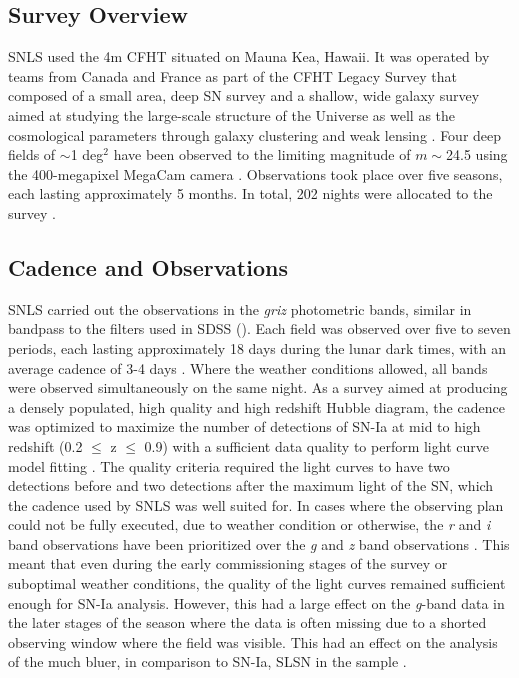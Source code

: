 \subsection{Survey Overview}
SNLS used the 4m CFHT situated on Mauna Kea, Hawaii. It was operated by teams from Canada and France as part of the CFHT Legacy Survey that composed of a small area, deep SN survey and a shallow, wide galaxy survey aimed at studying the large-scale structure of the Universe as well as the cosmological parameters through galaxy clustering and weak lensing \citep{Pritchet2004,Astier2006}. Four deep fields of $\sim$1 deg$^2$ have been observed to the limiting magnitude of $m\sim$24.5 using the 400-megapixel MegaCam camera \citep{Boulade2003}. Observations took place over five seasons, each lasting approximately 5 months. In total, 202 nights were allocated to the survey \citep{Pritchet2004}.

\subsection{Cadence and Observations}
SNLS carried out the observations in the \textit{griz} photometric bands, similar in bandpass to the filters used in SDSS (). Each field was observed over five to seven periods, each lasting approximately 18 days during the lunar dark times, with an average cadence of 3-4 days \citep{Astier2006,Guy2010}. Where the weather conditions allowed, all bands were observed simultaneously on the same night. As a survey aimed at producing a densely populated, high quality and high redshift Hubble diagram, the cadence was optimized to maximize the number of detections of SN-Ia at mid to high redshift (0.2 $\leq$ z $\leq$ 0.9) with a sufficient data quality to perform light curve model fitting \citep{Pritchet2004}. The quality criteria required the light curves to have two detections before and two detections after the maximum light of the SN, which the cadence used by SNLS was well suited for. In cases where the observing plan could not be fully executed, due to weather condition or otherwise, the \textit{r} and \textit{i} band observations have been prioritized over the \textit{g} and \textit{z} band observations \citep{Guy2010}. This meant that even during the early commissioning stages of the survey or suboptimal weather conditions, the quality of the light curves remained sufficient enough for SN-Ia analysis. However, this had a large effect on the \textit{g}-band data in the later stages of the season where the data is often missing due to a shorted observing window where the field was visible. This had an effect on the analysis of the much bluer, in comparison to SN-Ia, SLSN in the sample \citep{Prajs2016}.

